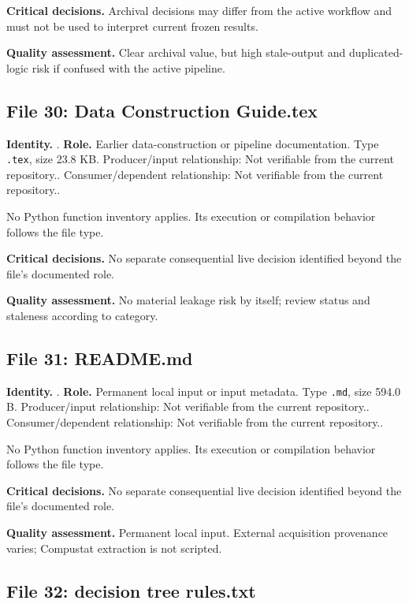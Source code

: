 \documentclass[
  11pt,
  a4paper]{article}
\begin{document}
\textbf{Critical decisions.} Archival decisions may differ from the
active workflow and must not be used to interpret current frozen
results.

\textbf{Quality assessment.} Clear archival value, but high stale-output
and duplicated-logic risk if confused with the active pipeline.

\subsection{File 30: Data Construction
Guide.tex}\label{file-3587774059189032961}

\textbf{Identity.} .
\textbf{Role.} Earlier data-construction or pipeline documentation. Type
\texttt{.tex}, size 23.8 KB. Producer/input relationship: Not verifiable
from the current repository.. Consumer/dependent relationship: Not
verifiable from the current repository..

No Python function inventory applies. Its execution or compilation
behavior follows the file type.

\textbf{Critical decisions.} No separate consequential live decision
identified beyond the file's documented role.

\textbf{Quality assessment.} No material leakage risk by itself; review
status and staleness according to category.

\subsection{File 31: README.md}\label{file-137611403431065244}

\textbf{Identity.} . \textbf{Role.} Permanent
local input or input metadata. Type \texttt{.md}, size 594.0 B.
Producer/input relationship: Not verifiable from the current
repository.. Consumer/dependent relationship: Not verifiable from the
current repository..

No Python function inventory applies. Its execution or compilation
behavior follows the file type.

\textbf{Critical decisions.} No separate consequential live decision
identified beyond the file's documented role.

\textbf{Quality assessment.} Permanent local input. External acquisition
provenance varies; Compustat extraction is not scripted.

\subsection{File 32: decision tree
rules.txt}\label{file-5788559336646451980}
\end{document}
